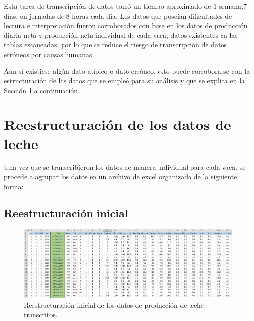 Esta tarea de transcripción de datos tomó un tiempo aproximado de 1 semana;7 días, en jornadas de 8 horas cada día. Los datos que poseían dificultades de lectura e interpretación fueron corroborados con base en los datos de producción diaria neta y producción neta individual de cada vaca, datos existentes en las tablas escaneadas; por lo que se reduce el riesgo de transcripción de datos erróneos por causas humanas.

Aún sí existiese algún dato atípico o dato erróneo, esto puede corroborarse con la estructuración de los datos que se empleó para su análisis y que se explica en la Sección \ref{reestructleche} a continuación.

\section{Reestructuración de los datos de leche}\label{reestructleche}
Una vez que se transcribieron los datos de manera individual para cada vaca. se procede a agrupar los datos en un archivo de excel organizado de la siguiente forma:

\subsection{Reestructuración inicial}

\begin{figure}[H]
	 \begin{center}
	 \includegraphics[scale=0.335]{img/dfinicial.jpg}
	 \end{center}
	 \caption{Reestructuración inicial de los datos de producción de leche transcritos. \label{dfinicialpng}}
\end{figure}

